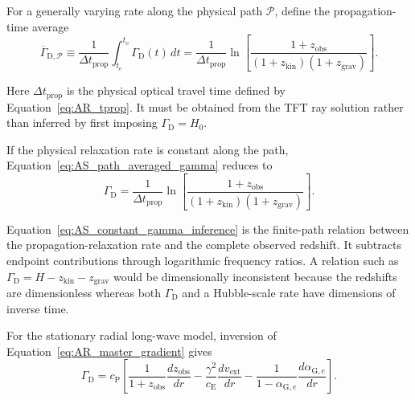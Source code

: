 For a generally varying rate along the physical path
\(\mathcal P\), define the propagation-time average
\begin{equation}
    \boxed{
    \overline{\Gamma}_{\mathrm D,\mathcal P}
    \equiv
    \frac{1}{
        \Delta t_{\mathrm{prop}}
    }
    \int_{t_{\mathrm e}}^{t_{\mathrm o}}
    \Gamma_{\mathrm D}(t)\,dt
    =
    \frac{1}{
        \Delta t_{\mathrm{prop}}
    }
    \ln
    \left[
        \frac{
            1+z_{\mathrm{obs}}
        }{
            (1+z_{\mathrm{kin}})
            (1+z_{\mathrm{grav}})
        }
    \right].
    }
    \label{eq:AS_path_averaged_gamma}
\end{equation}

Here
\(\Delta t_{\mathrm{prop}}\)
is the physical optical travel time defined by
Equation~\eqref{eq:AR_tprop}. It must be obtained from the TFT ray solution
rather than inferred by first imposing
\(\Gamma_{\mathrm D}=H_0\).

If the physical relaxation rate is constant along the path,
Equation~\eqref{eq:AS_path_averaged_gamma} reduces to
\begin{equation}
    \boxed{
    \Gamma_{\mathrm D}
    =
    \frac{1}{
        \Delta t_{\mathrm{prop}}
    }
    \ln
    \left[
        \frac{
            1+z_{\mathrm{obs}}
        }{
            (1+z_{\mathrm{kin}})
            (1+z_{\mathrm{grav}})
        }
    \right].
    }
    \label{eq:AS_constant_gamma_inference}
\end{equation}

Equation~\eqref{eq:AS_constant_gamma_inference} is the finite-path relation
between the propagation-relaxation rate and the complete observed redshift.
It subtracts endpoint contributions through logarithmic frequency ratios.
A relation such as
\(\Gamma_{\mathrm D}=H-z_{\mathrm{kin}}-z_{\mathrm{grav}}\)
would be dimensionally inconsistent because the redshifts are dimensionless
whereas both
\(\Gamma_{\mathrm D}\)
and a Hubble-scale rate have dimensions of inverse time.

For the stationary radial long-wave model, inversion of
Equation~\eqref{eq:AR_master_gradient} gives
\begin{equation}
    \boxed{
    \Gamma_{\mathrm D}
    =
    c_{\mathrm P}
    \left[
        \frac{1}{
            1+z_{\mathrm{obs}}
        }
        \frac{
            dz_{\mathrm{obs}}
        }{
            dr
        }
        -
        \frac{
            \gamma^2
        }{
            c_{\mathrm E}
        }
        \frac{
            dv_{\mathrm{ext}}
        }{
            dr
        }
        -
        \frac{1}{
            1-\alpha_{\mathrm G,e}
        }
        \frac{
            d\alpha_{\mathrm G,e}
        }{
            dr
        }
    \right].
    }
    \label{eq:AS_gamma_gradient_inversion}
\end{equation}

